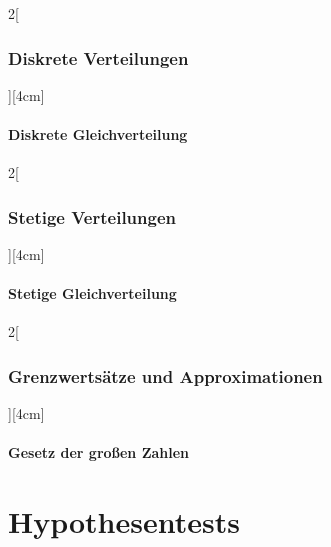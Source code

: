 \documentclass[8pt]{extarticle}
\begin{document}
\begin{multicols}{2}[\subsubsection{Diskrete Verteilungen}][4cm]

  \paragraph{Diskrete Gleichverteilung}
  


\end{multicols}

\begin{multicols}{2}[\subsubsection{Stetige Verteilungen}][4cm]

  \paragraph{Stetige Gleichverteilung}
  


\end{multicols}

\begin{multicols}{2}[\subsubsection{Grenzwertsätze und Approximationen}][4cm]

  \paragraph{Gesetz der großen Zahlen}
  


\end{multicols}


  



\section{Hypothesentests}
\end{document}
